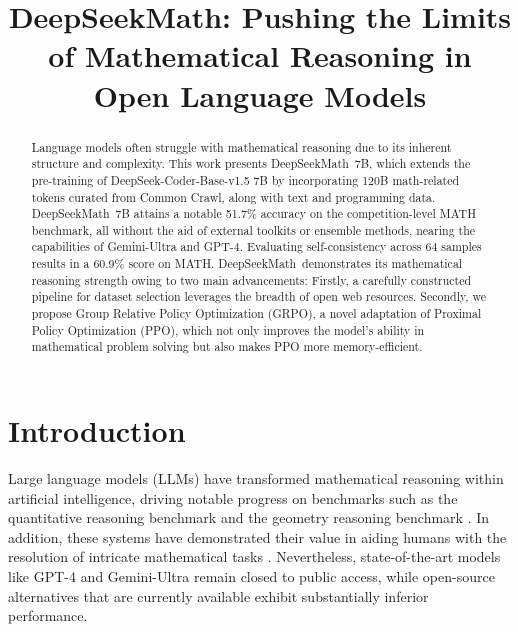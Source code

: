 \title{DeepSeekMath: Pushing the Limits of Mathematical Reasoning in Open Language Models}

\begin{abstract}
Language models often struggle with mathematical reasoning due to its inherent structure and complexity. This work presents DeepSeekMath~7B, which extends the pre-training of DeepSeek-Coder-Base-v1.5 7B by incorporating 120B math-related tokens curated from Common Crawl, along with text and programming data. DeepSeekMath~7B attains a notable 51.7\% accuracy on the competition-level MATH benchmark, all without the aid of external toolkits or ensemble methods, nearing the capabilities of Gemini-Ultra and GPT-4. Evaluating self-consistency across 64 samples results in a 60.9\% score on MATH. DeepSeekMath~demonstrates its mathematical reasoning strength owing to two main advancements: Firstly, a carefully constructed pipeline for dataset selection leverages the breadth of open web resources. Secondly, we propose Group Relative Policy Optimization (GRPO), a novel adaptation of Proximal Policy Optimization (PPO), which not only improves the model's ability in mathematical problem solving but also makes PPO more memory-efficient.
\end{abstract}

\section{Introduction}

Large language models (LLMs) have transformed mathematical reasoning within artificial intelligence, driving notable progress on benchmarks such as the quantitative reasoning benchmark \citep{MATH} and the geometry reasoning benchmark \citep{trinh2024solving}. In addition, these systems have demonstrated their value in aiding humans with the resolution of intricate mathematical tasks \citep{tao}. Nevertheless, state-of-the-art models like GPT-4 \citep{gpt4} and Gemini-Ultra \citep{gemini} remain closed to public access, while open-source alternatives that are currently available exhibit substantially inferior performance.

